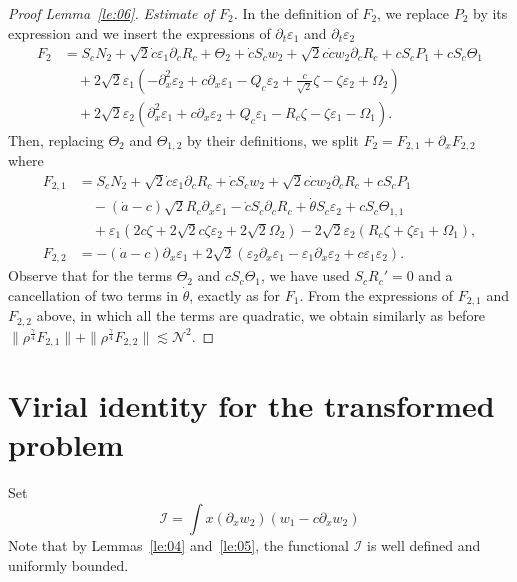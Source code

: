 \documentclass[11pt]{amsart}
\theoremstyle{remark}
\newcommand\cI{\mathcal{I}}
\newcommand\cN{\mathcal{N}}
\newcommand\ep{\varepsilon}
\begin{document}
\begin{proof}[Proof Lemma~\ref{le:06}]
\emph{Estimate of $F_2$.}
In the definition of $F_2$, we replace $P_2$ by its expression
and we insert the expressions of $\partial_t \ep_1$ and $\partial_t\ep_2$
\begin{align*}
F_2 &= S_c N_2+\sqrt{2} \dot c \ep_1 \partial_c R_c+\Theta_2+\dot c S_c w_2+\sqrt{2} c\dot c w_2\partial_c R_c+c S_c P_1+c S_c \Theta_1\\
&\quad +2 \sqrt{2} \ep_1 (-\partial_x^2\ep_2+c\partial_x\ep_1-Q_c\ep_2
+\frac{c}{\sqrt{2}}\zeta-\zeta\ep_2+\Omega_2)\\
&\quad
+2\sqrt{2}\ep_2(\partial_x^2\ep_1+c\partial_x\ep_2+Q_c\ep_1-R_c\zeta-\zeta\ep_1-\Omega_1).
\end{align*}
Then, replacing $\Theta_2$ and $\Theta_{1,2}$ by their definitions, 
we split $F_2 =F_{2,1}+\partial_x F_{2,2}$
where
\begin{align*}
F_{2,1}&=S_c N_2+\sqrt{2} \dot c \ep_1 \partial_c R_c+\dot c S_c w_2+\sqrt{2} c\dot c w_2\partial_c R_c+c S_c P_1\\
&\quad -(\dot a-c)\sqrt{2}R_c\partial_x\ep_1-\dot cS_c\partial_cR_c
+\dot \theta S_c \ep_2
+c S_c \Theta_{1,1}\\
&\quad +\ep_1(2c\zeta+2\sqrt{2}c\zeta\ep_2+2\sqrt{2}\Omega_2)
-2\sqrt{2}\ep_2(R_c\zeta+\zeta\ep_1+\Omega_1),\\
F_{2,2}&=
-(\dot a-c)\partial_x\ep_1
+2\sqrt{2}(\ep_2\partial_x\ep_1-\ep_1\partial_x\ep_2+c\ep_1\ep_2).
\end{align*}
Observe that for the terms
$\Theta_2$ and $cS_c\Theta_1$, we have used $S_cR_c'=0$ and a cancellation of two terms in $\dot \theta$,
exactly as for $F_1$.
From the expressions of $F_{2,1}$ and $F_{2,2}$ above, in which all the terms 
are quadratic, we obtain similarly as before
$
\|\rho^\frac\gamma4 F_{2,1}\|+\|\rho^\frac\gamma4F_{2,2}\|\lesssim \cN^2
$.
\end{proof}

\section{Virial identity for the transformed problem}
Set 
\[
\cI=\int x (\partial_x w_2)(w_1-c\partial_x w_2)
\]
Note that by Lemmas~\ref{le:04} and~\ref{le:05}, the functional $\cI$ is well defined
and uniformly bounded.
\end{document}
